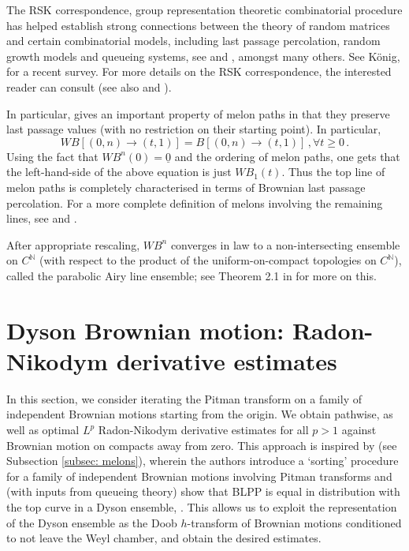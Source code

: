 \documentclass[11pt, reqno]{amsart}
\numberwithin{equation}{section}
\begin{document}
The RSK correspondence, group representation theoretic combinatorial procedure has helped establish strong connections between the theory of random matrices and certain combinatorial models, including last passage percolation, 
random growth models and queueing systems, see \cite{baik1999distribution} and \cite{johansson2000shape}, amongst many others. See K\"{o}nig, \cite{konig2005orthogonal} for a recent survey. For more details on the RSK correspondence, the interested reader can consult \cite{ZygourasalgKPZ} (see also  \cite{dauvergne2022rsk} and \cite{oconnell2003conditioned}).

In particular, \cite[Proposition 4.1]{DOV} gives an important property of melon paths in that they preserve last passage values (with no restriction on their starting point). In particular, 
\[
WB[(0,n)\to (t,1)] = B[(0,n)\to (t,1)]\,,\forall t\ge 0\,.
\]
Using the fact that $WB^n(0) = \underline{0}$ and the ordering of melon paths, one gets that the left-hand-side of the above equation is just $WB_1(t)$. Thus the top line of melon paths is completely characterised in terms of Brownian last passage percolation. For a more complete definition of melons involving the remaining lines, see \cite[sec. 2]{DOV} and \cite{O2002representation}.

After appropriate rescaling, \(WB^n\) converges in law to a non-intersecting ensemble on \(C^{\mathbb{N}}\) (with respect to the product of the uniform-on-compact topologies on \(C^{\mathbb{N}}\)), called the parabolic Airy line ensemble; see Theorem 2.1 in \cite{DOV} for more on this. 

\section{Dyson Brownian motion: Radon-Nikodym derivative estimates}\label{sec: dyson bm estimates}
 In this section, we consider iterating the Pitman transform on a family of independent Brownian motions starting from the origin. We obtain pathwise, as well as optimal $L^p$ Radon-Nikodym derivative estimates for all $p>1$ against Brownian motion on compacts away from zero. This approach is inspired by \cite{O2002representation} (see Subsection \ref{subsec: melons}), wherein the authors introduce a `sorting' procedure for a family of independent Brownian motions involving Pitman transforms and (with inputs from queueing theory) show that BLPP is equal in distribution with the top curve in a Dyson ensemble, \cite[Theorem 7]{O2002representation}. This allows us to exploit the representation of the Dyson ensemble as the Doob $h$-transform of Brownian motions conditioned to not leave the Weyl chamber, and obtain the desired estimates.
 
\end{document}
